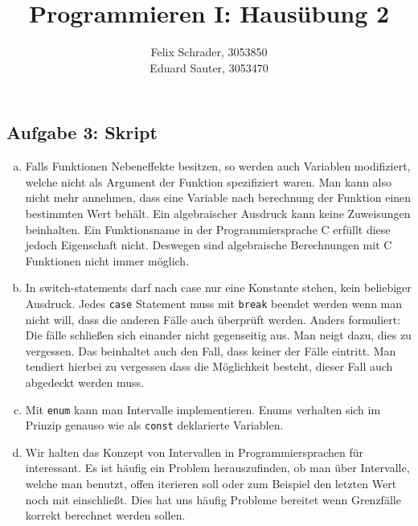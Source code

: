\documentclass[11pt]{article}
\author{Felix Schrader, 3053850 \\
      Eduard Sauter, 3053470 }
\title{Programmieren I: Haus\"ubung 2}
\begin{document}
\maketitle
\subsection*{Aufgabe 3: Skript}
\begin{enumerate}[a)]
  \item Falls Funktionen Nebeneffekte besitzen, so werden auch Variablen
    modifiziert, welche nicht als Argument der Funktion spezifiziert waren.
    Man kann also nicht mehr annehmen, dass eine Variable nach berechnung 
    der Funktion einen bestimmten Wert beh\"alt. Ein algebraischer
    Ausdruck kann keine Zuweisungen beinhalten. Ein Funktionsname in der 
    Programmiersprache C erf\"ullt diese jedoch Eigenschaft nicht. Deswegen sind
    algebraische Berechnungen mit C Funktionen nicht immer m\"oglich.

  \item In switch-statements darf nach case nur eine Konstante stehen, 
    kein beliebiger Ausdruck. Jedes \texttt{case} Statement muss mit
    \texttt{break} beendet werden wenn man nicht will, dass die anderen F\"alle
    auch \"uberpr\"uft werden. Anders formuliert: Die f\"alle schlie\ss{}en
    sich einander nicht gegenseitig aus.  Man neigt dazu, dies zu vergessen.
    Das beinhaltet auch den Fall, dass keiner der F\"alle eintritt. Man
    tendiert hierbei zu vergessen dass die M\"oglichkeit besteht, dieser Fall
    auch abgedeckt werden muss.

  \item Mit \texttt{enum} kann man Intervalle implementieren. Enums verhalten
    sich im Prinzip genauso wie als \texttt{const} deklarierte Variablen.

  \item Wir halten das Konzept von Intervallen in Programmiersprachen f\"ur
    interessant. Es ist h\"aufig ein Problem herauszufinden, ob man \"uber Intervalle,
    welche man benutzt, offen iterieren soll oder zum Beispiel den letzten
    Wert noch mit einschlie\ss{}t. Dies hat uns h\"aufig Probleme bereitet
    wenn Grenzf\"alle korrekt berechnet werden sollen.
\end{enumerate}
\end{document}
